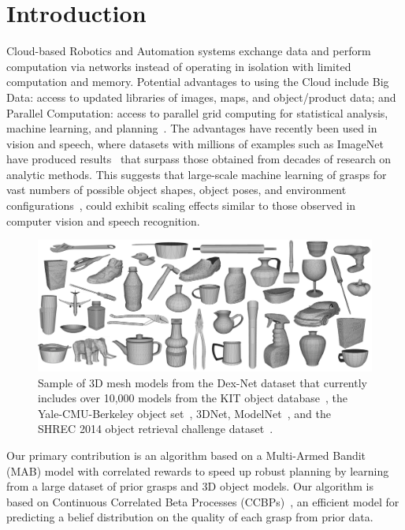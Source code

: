 \section{Introduction}

Cloud-based Robotics and Automation systems exchange data and perform computation via networks instead of operating in isolation with limited computation and memory.
Potential advantages to using the Cloud include Big Data: access to updated libraries of images, maps, and object/product data; and Parallel Computation: access to parallel grid computing for statistical analysis, machine learning, and planning~\cite{kehoe2015survey}.
The advantages have recently been used in vision and speech, where datasets with millions of examples such as ImageNet have produced results~\cite{hannun2014deepspeech, krizhevsky2012imagenet} that surpass those obtained from decades of research on analytic methods.
This suggests that large-scale machine learning of grasps for vast numbers of possible object shapes, object poses, and environment configurations~\cite{goldfeder2011data, lenz2015deep, kappler2015leveraging}, could exhibit scaling effects similar to those observed in computer vision and speech recognition.

\begin{figure}[t!]
\centering
\includegraphics[scale=0.08]{figures/dexnet_collage.jpg}
\caption{Sample of 3D mesh models from the Dex-Net dataset that currently includes over 10,000 models from the KIT object database~\cite{kasper2012kit}, the Yale-CMU-Berkeley object set~\cite{calli2015benchmarking}, 3DNet\cite{wohlkinger20123dnet}, ModelNet~\cite{wu20153d}, and the SHREC 2014 object retrieval challenge dataset~\cite{li2015comparison}. }
\vspace*{-15pt}
\end{figure}

Our primary contribution is an algorithm based on a Multi-Armed Bandit (MAB) model with correlated rewards to speed up robust planning by learning from a large dataset of prior grasps and 3D object models.
Our algorithm is based on Continuous Correlated Beta Processes (CCBPs)~\cite{goetschalckx2011continuous, montesano2012active}, an efficient model for predicting a belief distribution on the quality of each grasp from prior data.

